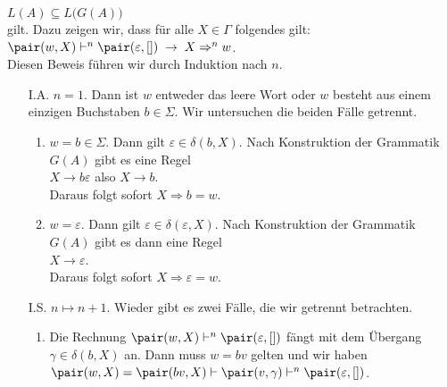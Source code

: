\hspace*{1.3cm}
$L(A) \subseteq L\bigl(G(A)\bigr)$
\\[0.2cm]
gilt.  Dazu zeigen wir, dass f\"ur alle $X \in \Gamma$ folgendes gilt:
\\[0.2cm]
\hspace*{1.3cm}
$\pair(w,X) \vdash^n \pair(\varepsilon, []) \;\rightarrow\; X \Rightarrow^n w$.
\\[0.2cm]
Diesen Beweis f\"uhren wir durch Induktion nach $n$.
\begin{enumerate}
\item[I.A.] $n = 1$.  Dann ist $w$ entweder das leere Wort oder $w$ besteht aus einem einzigen Buchstaben 
            $b \in \Sigma$.  Wir untersuchen die beiden F\"alle getrennt.
            \begin{enumerate}
            \item $w = b \in \Sigma$.  Dann gilt $\varepsilon \in \delta(b,X)$.
                  Nach Konstruktion der Grammatik $G(A)$ gibt es eine Regel
                  \\[0.2cm]
                  \hspace*{1.3cm}
                  $X \rightarrow b \varepsilon$ \quad also \quad $X \rightarrow b$.
                  \\[0.2cm]
                  Daraus folgt sofort $X \Rightarrow b = w$.
            \item $w = \varepsilon$.  Dann gilt $\varepsilon \in \delta(\varepsilon,X)$.
                  Nach Konstruktion der Grammatik $G(A)$ gibt es dann eine Regel
                  \\[0.2cm]
                  \hspace*{1.3cm}
                  $X \rightarrow \varepsilon$.
                  \\[0.2cm]
                  Daraus folgt sofort $X \Rightarrow \varepsilon = w$.
            \end{enumerate}
\item[I.S.] $n \mapsto n+1$.  Wieder gibt es zwei F\"alle, die wir getrennt betrachten.
            \begin{enumerate}
            \item Die Rechnung $\pair(w,X) \vdash^n \pair(\varepsilon, [])$
                  f\"angt mit dem \"Ubergang $\gamma \in \delta(b,X)$ an. Dann
                  muss $w = bv$ gelten und wir haben
                  \\[0.2cm]
                  \hspace*{1.3cm}
                  $\pair(w, X) = \pair(bv, X) \vdash \pair(v, \gamma) \vdash^n \pair(\varepsilon, [])$.

\end{enumerate}
\end{enumerate}
